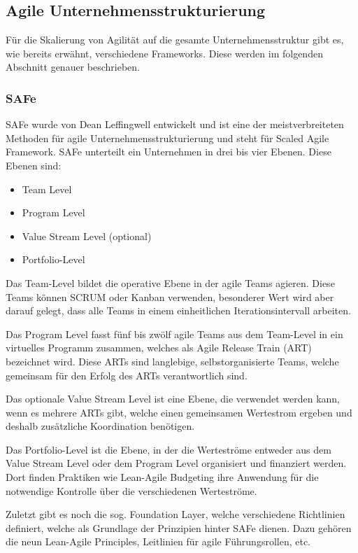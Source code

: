 \subsection{Agile Unternehmensstrukturierung}
Für die Skalierung von Agilität auf die gesamte Unternehmensstruktur gibt es, wie bereits erwähnt, verschiedene Frameworks. Diese werden im folgenden Abschnitt genauer beschrieben.

\subsubsection{SAFe}
SAFe wurde von Dean Leffingwell entwickelt und ist eine der meistverbreiteten Methoden für agile Unternehmensstrukturierung und steht für Scaled Agile Framework.
SAFe unterteilt ein Unternehmen in drei bis vier Ebenen. Diese Ebenen sind:

\begin{itemize}
    \item Team Level
    \item Program Level
    \item Value Stream Level (optional)
    \item Portfolio-Level
\end{itemize}

Das Team-Level bildet die operative Ebene in der agile Teams agieren. Diese Teams können SCRUM oder Kanban verwenden, besonderer Wert wird aber darauf gelegt, dass alle Teams in einem einheitlichen Iterationsintervall arbeiten.

Das Program Level fasst fünf bis zwölf agile Teams aus dem Team-Level in ein virtuelles Programm zusammen, welches als Agile Release Train (ART) bezeichnet wird. Diese ARTs sind langlebige, selbstorganisierte Teams, welche gemeinsam für den Erfolg des ARTs verantwortlich sind.

Das optionale Value Stream Level ist eine Ebene, die verwendet werden kann, wenn es mehrere ARTs gibt, welche einen gemeinsamen Wertestrom ergeben und deshalb zusätzliche Koordination benötigen.

Das Portfolio-Level ist die Ebene, in der die Werteströme entweder aus dem Value Stream Level oder dem Program Level organisiert und finanziert werden. Dort finden Praktiken wie Lean-Agile Budgeting ihre Anwendung für die notwendige Kontrolle über die verschiedenen Werteströme.

Zuletzt gibt es noch die sog. Foundation Layer, welche verschiedene Richtlinien definiert, welche als Grundlage der Prinzipien hinter SAFe dienen. Dazu gehören die neun Lean-Agile Principles, Leitlinien für agile Führungsrollen, etc. \cite{leffingwell20safe}

